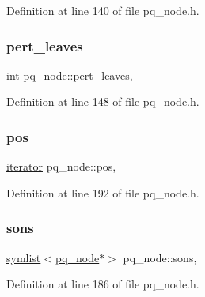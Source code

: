 Definition at line 140 of file pq\+\_\+node.\+h.

\mbox{\label{classpq__node_a3fb78609f93f41efd6826ed3169fc312}} 
\subsubsection{\texorpdfstring{pert\+\_\+leaves}{pert\_leaves}}
{\footnotesize\ttfamily int pq\+\_\+node\+::pert\+\_\+leaves\hspace{0.3cm}{\ttfamily [protected]}, {\ttfamily [inherited]}}



Definition at line 148 of file pq\+\_\+node.\+h.

\mbox{\label{classpq__node_a5e8a5defa0fec4ff2e82fabee97296b4}} 
\subsubsection{\texorpdfstring{pos}{pos}}
{\footnotesize\ttfamily \mbox{\hyperlink{classpq__node_a34898c9eb1527787c07e8ebefd6bfba5}{iterator}} pq\+\_\+node\+::pos\hspace{0.3cm}{\ttfamily [protected]}, {\ttfamily [inherited]}}



Definition at line 192 of file pq\+\_\+node.\+h.

\mbox{\label{classpq__node_a2cc030cfa4560872acea8b50ebd0542b}} 
\subsubsection{\texorpdfstring{sons}{sons}}
{\footnotesize\ttfamily \mbox{\hyperlink{classsymlist}{symlist}}$<$\mbox{\hyperlink{classpq__node}{pq\+\_\+node}}$\ast$$>$ pq\+\_\+node\+::sons\hspace{0.3cm}{\ttfamily [protected]}, {\ttfamily [inherited]}}



Definition at line 186 of file pq\+\_\+node.\+h.

\mbox{\label{classpq__node_ae6d5a236397b9a57159487eac7ec168d}} 
